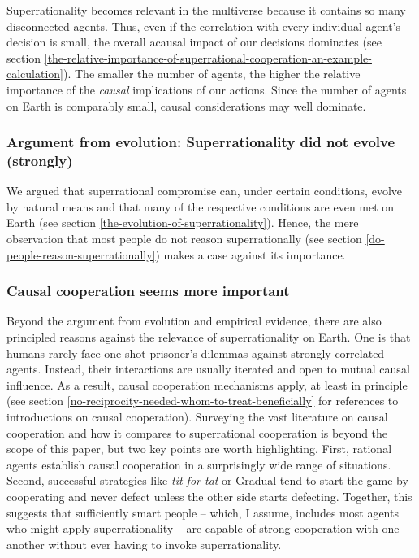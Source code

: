 Superrationality becomes relevant in the multiverse because it contains
so many disconnected agents. Thus, even if the correlation with every
individual agent's decision is small, the overall acausal impact of our
decisions dominates (see section
\ref{the-relative-importance-of-superrational-cooperation-an-example-calculation}). The smaller the number of agents, the higher the
relative importance of the \emph{causal} implications of our actions.
Since the number of agents on Earth is comparably small, causal
considerations may well dominate.

\subsubsection{Argument from evolution: Superrationality did not evolve
(strongly)}\label{argument-from-evolution-superrationality-did-not-evolve-strongly}

We argued that superrational compromise can, under certain conditions,
evolve by natural means and that many of the respective conditions are
even met on Earth (see section
\ref{the-evolution-of-superrationality}). Hence, the mere observation that
most people do not reason superrationally (see section
\ref{do-people-reason-superrationally}) makes a case against its importance.

\subsubsection{Causal cooperation seems more
important}\label{causal-cooperation-seems-more-important}

Beyond the argument from evolution and empirical evidence, there are
also principled reasons against the relevance of superrationality on
Earth. One is that humans rarely face one-shot prisoner's dilemmas
against strongly correlated agents. Instead, their interactions are
usually iterated and open to mutual causal influence. As a result,
causal cooperation mechanisms apply, at least in principle (see section
\ref{no-reciprocity-needed-whom-to-treat-beneficially} for references to introductions on causal cooperation).
Surveying the vast literature on causal cooperation and how it compares
to superrational cooperation is beyond the scope of this paper, but two
key points are worth highlighting. First, rational agents establish
causal cooperation in a surprisingly wide range of situations. Second,
successful strategies like
\href{https://en.wikipedia.org/wiki/Tit_for_tat}{\emph{tit-for-tat}} or
Gradual \parencite{Beaufils1997-mi} tend to start the game
by cooperating and never defect unless the other side starts defecting.
Together, this suggests that sufficiently smart people -- which, I
assume, includes most agents who might apply superrationality -- are
capable of strong cooperation with one another without ever having to
invoke superrationality.

